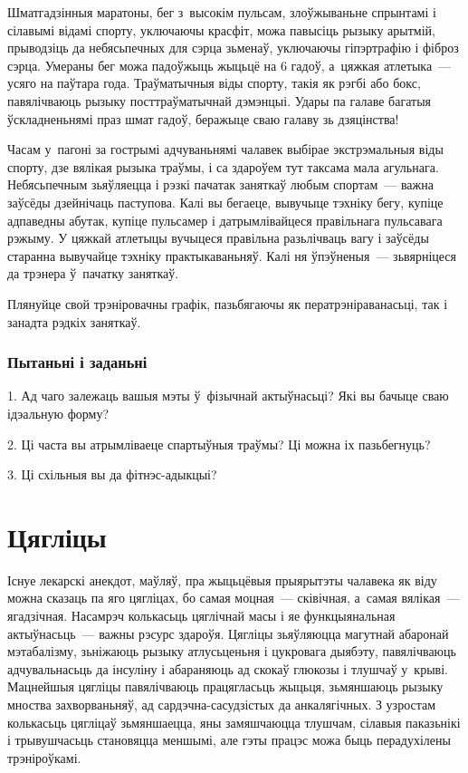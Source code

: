 Шматгадзінныя маратоны, бег з~высокім пульсам, злоўжываньне спрынтамі і сілавымі відамі спорту, уключаючы красфіт, можа павысіць рызыку арытмій, прыводзіць да небясьпечных для сэрца зьменаў, уключаючы гіпэртрафію і фіброз сэрца. Умераны бег можа падоўжыць жыцьцё на 6 гадоў, а~цяжкая атлетыка~--- усяго на паўтара года. Траўматычныя віды спорту, такія як рэгбі або бокс, павялічваюць рызыку посттраўматычнай дэмэнцыі. Удары па галаве багатыя ўскладненьнямі праз шмат гадоў, беражыце сваю галаву зь дзяцінства!

Часам у~пагоні за гострымі адчуваньнямі чалавек выбірае экстрэмальныя віды спорту, дзе вялікая рызыка траўмы, і са здароўем тут таксама мала агульнага. Небясьпечным зьяўляецца і рэзкі пачатак заняткаў любым спортам~--- важна заўсёды дзейнічаць паступова. Калі вы бегаеце, вывучыце тэхніку бегу, купіце адпаведны абутак, купіце пульсамер і датрымлівайцеся правільнага пульсавага рэжыму. У цяжкай атлетыцы вучыцеся правільна разьлічваць вагу і заўсёды старанна вывучайце тэхніку практыкаваньняў. Калі ня ўпэўненыя~--- зьвярніцеся да трэнера ў~пачатку заняткаў.

Плянуйце свой трэніровачны графік, пазьбягаючы як ператрэніраванасьці, так і занадта рэдкіх заняткаў.

\subsubsection{Пытаньні і заданьні}

1. Ад чаго залежаць вашыя мэты ў~фізычнай актыўнасьці? Які вы бачыце сваю ідэальную форму?

2. Ці часта вы атрымліваеце спартыўныя траўмы? Ці можна іх пазьбегнуць?

3. Ці схільныя вы да фітнэс-адыкцыі?


\section{Цягліцы}

Існуе лекарскі анекдот, маўляў, пра жыцьцёвыя прыярытэты чалавека як віду можна сказаць па яго цягліцах, бо самая моцная~--- сківічная, а~самая вялікая~--- ягадзічная. Насамрэч колькасьць цяглічнай масы і яе функцыянальная актыўнасьць~--- важны рэсурс здароўя. Цягліцы зьяўляюцца магутнай абаронай мэтабалізму, зьніжаюць рызыку атлусьценьня і цукровага дыябэту, павялічваюць адчувальнасьць да інсуліну і абараняюць ад скокаў глюкозы і тлушчаў у~крыві. Мацнейшыя цягліцы павялічваюць працягласьць жыцьця, зьмяншаюць рызыку мноства захворваньняў, ад сардэчна-сасудзістых да анкалягічных. З узростам колькасьць цягліцаў зьмяншаецца, яны замяшчаюцца тлушчам, сілавыя паказьнікі і трывушчасьць становяцца меншымі, але гэты працэс можа быць перадухілены трэніроўкамі.

